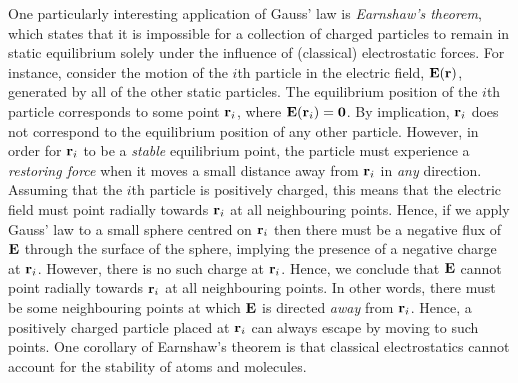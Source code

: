 One particularly interesting application of Gauss' law is {\em Earnshaw's
theorem}, which states that it is impossible for a collection of charged particles to
remain in static equilibrium solely under the influence of (classical) electrostatic forces.
For instance, consider the motion of the $i$th particle in the
electric field, ${\bf E}({\bf r})$, generated by all of the other static particles.
The equilibrium position of the $i$th particle corresponds to some
point ${\bf r}_i$, where ${\bf E}({\bf r}_i)={\bf 0}$. By  implication,
${\bf r}_i$ does not correspond to the equilibrium position of
any other particle.
However, in order
for ${\bf r}_i$  to be a {\em stable} equilibrium point, the particle
must experience a {\em restoring force} when it moves a small
distance away from ${\bf r}_i$ in {\em any} direction. Assuming that the
$i$th particle is positively charged, this means that the electric
field  must  point radially towards
${\bf r}_i$ at all neighbouring points. Hence, if we apply Gauss' law to a small
sphere centred on ${\bf r}_i$ then there must be a negative flux of
${\bf E}$ through the surface of the sphere, implying the presence of a negative
charge at ${\bf r}_i$. However, there is no such charge at ${\bf r}_i$.
Hence, we conclude that ${\bf E}$ cannot point radially towards ${\bf r}_i$
at all neighbouring points. In other
words, there must be some neighbouring points at which ${\bf E}$ is directed {\em away}
from ${\bf r}_i$. Hence, a positively charged particle
placed at ${\bf r}_i$ can always escape by moving to such points.
One corollary of Earnshaw's theorem is that classical electrostatics cannot
account for the stability of atoms and molecules.

